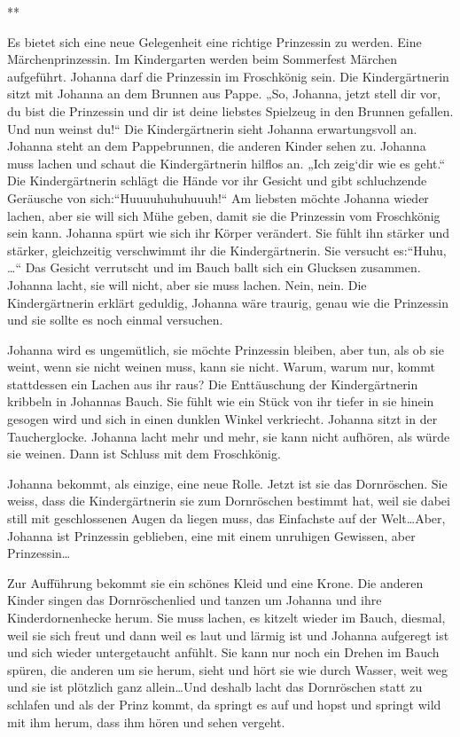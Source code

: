 \documentclass[10pt,titlepage,a5paper]{book}
\newcommand{\sterne}{\par{\centering ***\par}}
\begin{document}
\sterne


Es bietet sich eine neue Gelegenheit eine richtige Prinzessin zu werden. Eine Märchenprinzessin. Im Kindergarten werden beim Sommerfest Märchen aufgeführt. Johanna darf die Prinzessin im Froschkönig sein. Die Kindergärtnerin sitzt mit Johanna an dem Brunnen aus Pappe. „So, Johanna, jetzt stell dir vor, du bist die Prinzessin und dir ist deine liebstes Spielzeug in den Brunnen gefallen. Und nun weinst du!“ Die Kindergärtnerin sieht Johanna erwartungsvoll an. Johanna steht an dem Pappebrunnen, die anderen Kinder sehen zu. Johanna muss lachen und schaut die Kindergärtnerin hilflos an. „Ich zeig`dir wie es geht.“ Die Kindergärtnerin schlägt die Hände vor ihr Gesicht und gibt schluchzende Geräusche von sich:“Huuuuhuhuhuuuh!“ Am liebsten möchte Johanna wieder lachen, aber sie will sich Mühe geben, damit sie die Prinzessin vom Froschkönig sein kann. Johanna spürt wie sich ihr Körper verändert. Sie fühlt ihn stärker und stärker, gleichzeitig verschwimmt ihr die Kindergärtnerin. Sie versucht es:“Huhu, \dots“ Das Gesicht verrutscht und im Bauch ballt sich ein Glucksen zusammen. Johanna lacht, sie will nicht, aber sie muss lachen.
Nein, nein. Die Kindergärtnerin erklärt geduldig, Johanna wäre traurig, genau wie die Prinzessin und sie sollte es noch einmal versuchen.

Johanna wird es ungemütlich, sie möchte Prinzessin bleiben, aber tun, als ob sie weint, wenn sie nicht weinen muss, kann sie nicht. Warum, warum nur, kommt stattdessen ein Lachen aus ihr raus? Die Enttäuschung der Kindergärtnerin kribbeln in Johannas Bauch. Sie fühlt wie ein Stück von ihr tiefer  in sie hinein gesogen wird und sich in einen dunklen Winkel verkriecht. Johanna sitzt in der Taucherglocke. Johanna lacht mehr und mehr, sie kann nicht aufhören, als würde sie weinen. Dann ist Schluss mit dem Froschkönig. 

Johanna bekommt, als einzige, eine neue Rolle. Jetzt ist sie das Dornröschen. Sie weiss, dass die Kindergärtnerin sie zum Dornröschen bestimmt hat, weil sie dabei still mit geschlossenen Augen da liegen muss, das Einfachste auf der Welt\dots Aber, Johanna ist Prinzessin geblieben, eine mit einem unruhigen Gewissen, aber Prinzessin\dots

Zur Aufführung bekommt sie ein schönes Kleid und eine Krone. Die anderen Kinder singen das Dornröschenlied und tanzen um Johanna und ihre Kinderdornenhecke herum. Sie muss lachen, es kitzelt wieder im Bauch, diesmal, weil sie sich freut und dann weil es laut und lärmig ist und Johanna aufgeregt ist und sich wieder untergetaucht anfühlt. Sie kann nur noch ein Drehen im Bauch spüren, die anderen um sie herum, sieht und hört sie wie durch Wasser, weit weg und sie ist plötzlich ganz allein\dots Und deshalb lacht das Dornröschen statt zu schlafen und als der Prinz kommt, da springt es auf und hopst und springt wild mit ihm herum, dass ihm hören und sehen vergeht. 
\end{document}
